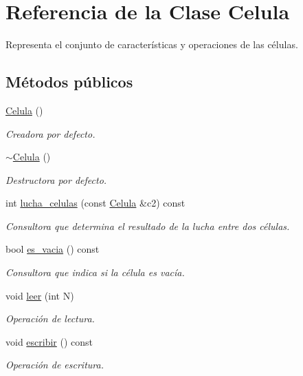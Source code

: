 \hypertarget{class_celula}{\section{\-Referencia de la \-Clase \-Celula}
\label{class_celula}
}


\-Representa el conjunto de características y operaciones de las células.  


\subsection*{\-Métodos públicos}
\begin{DoxyCompactItemize}
\item 
\hyperlink{class_celula_a3c5017fbcec8cb564acc666aa7e21206}{\-Celula} ()
\begin{DoxyCompactList}\small\item\em \-Creadora por defecto. \end{DoxyCompactList}\item 
\hyperlink{class_celula_aa102b024e4c8d91a2f69afa14d4e4130}{$\sim$\-Celula} ()
\begin{DoxyCompactList}\small\item\em \-Destructora por defecto. \end{DoxyCompactList}\item 
int \hyperlink{class_celula_a3dd8be98f1548b02696e2fc32b8d19b4}{lucha\-\_\-celulas} (const \hyperlink{class_celula}{\-Celula} \&c2) const 
\begin{DoxyCompactList}\small\item\em \-Consultora que determina el resultado de la lucha entre dos células. \end{DoxyCompactList}\item 
bool \hyperlink{class_celula_a4e97c60a207191b2cc951ccdf245df4b}{es\-\_\-vacia} () const 
\begin{DoxyCompactList}\small\item\em \-Consultora que indica si la célula es vacía. \end{DoxyCompactList}\item 
void \hyperlink{class_celula_a5124ea0c0da24dfc295dcc428652ee43}{leer} (int \-N)
\begin{DoxyCompactList}\small\item\em \-Operación de lectura. \end{DoxyCompactList}\item 
void \hyperlink{class_celula_ae16a94d28e49affafd260405414f37ad}{escribir} () const 
\begin{DoxyCompactList}\small\item\em \-Operación de escritura. \end{DoxyCompactList}\end{DoxyCompactItemize}
